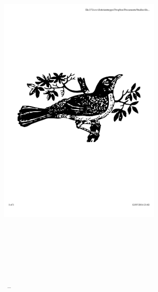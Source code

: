 \begin{titlepage}
	\begin{addmargin}[-1cm]{-3cm}
    \begin{center}
        \large  

        \hfill

        \vfill

        \begingroup
            \color{Maroon}\spacedallcaps{\myTitle} \\ \bigskip
        \endgroup

        \spacedlowsmallcaps{\myName}

        \vfill

        \includegraphics[width=8cm]{gfx/mockingbird} \\ \medskip

        \mySubtitle \\ \medskip   
        \myDegree \\
        \myDepartment \\                            
        \myFaculty \\
        \myUni \\ \bigskip

        \myTime\ -- \myVersion

        \vfill                      

    \end{center}  
  \end{addmargin}       
\end{titlepage}   